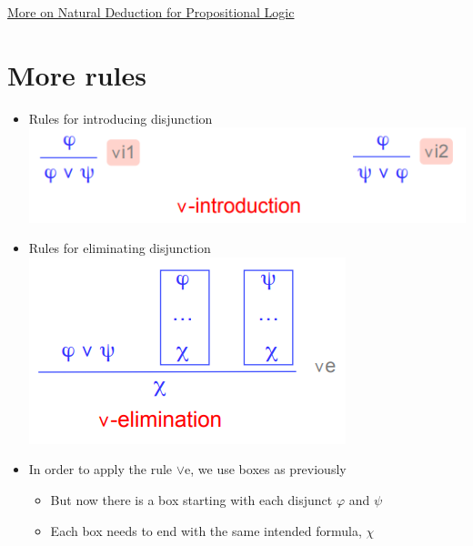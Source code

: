 \documentclass{article}[18pt]
\begin{document}
\begin{center}
\underline{\huge More on Natural Deduction for Propositional Logic}
\end{center}
\section{More rules}
\begin{itemize}
	\item Rules for introducing disjunction\\
	\includegraphics[scale=0.7]{v-introduction.png}
	\item Rules for eliminating disjunction\\
	\includegraphics[scale=0.7]{v-elimination.png}\
	\item In order to apply the rule $\lor$e, we use boxes as previously
	\begin{itemize}
		\item But now there is a box starting with each disjunct $\varphi$ and $\psi$
		\item Each box needs to end with the same intended formula, $\chi$
	\end{itemize}
\end{itemize}
\end{document}
